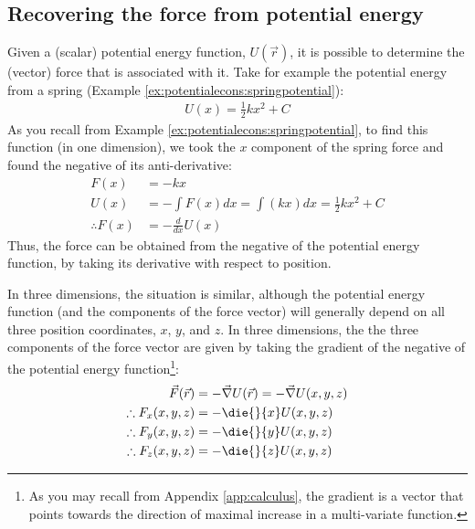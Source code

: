 \subsection{Recovering the force from potential energy}
Given a (scalar) potential energy function, $U(\vec r)$, it is possible to determine the (vector) force that is associated with it. Take for example the potential energy from a spring (Example \ref{ex:potentialecons:springpotential}):
\begin{align*}
U(x) = \frac{1}{2}kx^2 + C
\end{align*} 
As you recall from Example \ref{ex:potentialecons:springpotential}, to find this function (in one dimension), we took the $x$ component of the spring force and found the negative of its anti-derivative:
\begin{align*}
F(x) &= -kx\\
U(x) &= -\int F(x) dx = \int (kx) dx = \frac{1}{2}kx^2+C\\
\therefore F(x) &= -\frac{d}{dx}U(x)
\end{align*}
Thus, the force can be obtained from the negative of the potential energy function, by taking its derivative with respect to position.

In three dimensions, the situation is similar, although the potential energy function (and the components of the force vector) will generally depend on all three position coordinates, $x$, $y$, and $z$. In three dimensions, the the three components of the force vector are given by taking the gradient of the negative of the potential energy function\footnote{As you may recall from Appendix \ref{app:calculus}, the gradient is a vector that points towards the direction of maximal increase in a multi-variate function.}:
\begin{align}
\vec F(\vec r) &= -\vec\nabla U(\vec r)=-\vec\nabla U(x,y,z)\nonumber\\
\therefore F_x(x,y,z) &= -\die{}{x}U(x,y,z)\nonumber\\
\therefore F_y(x,y,z) &= -\die{}{y}U(x,y,z)\nonumber\\
\therefore F_z(x,y,z) &= -\die{}{z}U(x,y,z)
\end{align}

